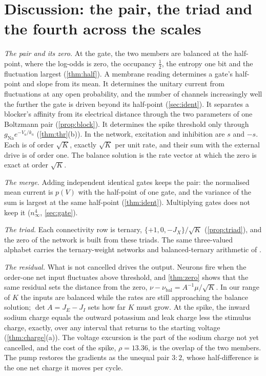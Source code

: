 \documentclass[11pt]{article}
\theoremstyle{definition}\newtheorem{definition}[theorem]{Definition}
\theoremstyle{remark}\newtheorem{remark}[theorem]{Remark}
\begin{document}
\section{Discussion: the pair, the triad and the fourth across the scales}\label{sec:interp}
\emph{The pair and its zero.} At the gate, the two members are balanced at the half-point, where the log-odds is zero, the occupancy $\frac12$, the entropy one bit and the fluctuation largest (\cref{thm:half}). A membrane reading determines a gate's half-point and slope from its mean. It determines the unitary current from fluctuations at any open probability, and the number of channels increasingly well the further the gate is driven beyond its half-point (\cref{sec:ident}). It separates a blocker's affinity from its electrical distance through the two parameters of one Boltzmann pair (\cref{prop:block}). It determines the spike threshold only through $g_\mathrm{Na}e^{-V_a/k_a}$ (\cref{thm:thr}(b)). In the network, excitation and inhibition are $s$ and $-s$. Each is of order $\sqrt K$, exactly $\sqrt K$ per unit rate, and their sum with the external drive is of order one. The balance solution is the rate vector at which the zero is exact at order $\sqrt K$.

\emph{The merge.} Adding independent identical gates keeps the pair: the normalised mean current is $p(V)$ with the half-point of one gate, and the variance of the sum is largest at the same half-point (\cref{thm:ident}). Multiplying gates does not keep it ($n_\infty^4$, \cref{sec:gate}).

\emph{The triad.} Each connectivity row is ternary, $\{+1,0,-J_X\}/\sqrt K$ (\cref{prop:triad}), and the zero of the network is built from these triads. The same three-valued alphabet carries the ternary-weight networks and balanced-ternary arithmetic of \cite{Algo}.

\emph{The residual.} What is not cancelled drives the output. Neurons fire when the order-one net input fluctuates above threshold, and \cref{thm:zero} shows that the same residual sets the distance from the zero, $\nu-\nu_{\mathrm{bal}}=A^{-1}\mu/\sqrt K$. In our range of $K$ the inputs are balanced while the rates are still approaching the balance solution; $\det A=J_E-J_I$ sets how far $K$ must grow. At the spike, the inward sodium charge equals the outward potassium and leak charge less the stimulus charge, exactly, over any interval that returns to the starting voltage (\cref{thm:charge}(a)). The voltage excursion is the part of the sodium charge not yet cancelled, and the cost of the spike, $\rho=13.36$, is the overlap of the two members. The pump restores the gradients as the unequal pair $3{:}2$, whose half-difference is the one net charge it moves per cycle.
\end{document}
